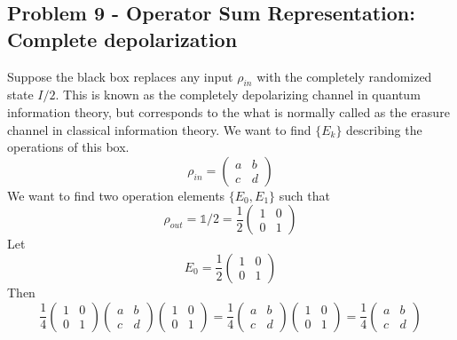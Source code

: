 \subsection{Problem 9 - Operator Sum Representation: Complete depolarization}
Suppose the black box replaces any input $\rho_{in}$ with the completely randomized state $I/2$. This is known as the completely depolarizing channel in quantum information theory, but corresponds to the what is normally called as the erasure channel in classical information theory. We want to find $\{E_k\}$ describing the operations of this box.
\begin{equation}
    \rho_{in} = \begin{pmatrix}a & b \\ c & d\end{pmatrix}
\end{equation}
We want to find two operation elements $\{E_0,E_1\}$ such that 
\begin{equation}
    \rho_{out} = \mathbb{1}/2 = \frac{1}{2}\begin{pmatrix}1 & 0 \\ 0 & 1\end{pmatrix}
\end{equation}
Let 
\begin{equation}
    E_0 = \frac{1}{2}\begin{pmatrix}1 & 0 \\ 0 & 1\end{pmatrix}
\end{equation}
Then 
\begin{equation}
    \frac{1}{4}\begin{pmatrix}1 & 0\\ 0 & 1\end{pmatrix}  \begin{pmatrix}a & b \\ c & d\end{pmatrix} \begin{pmatrix}1 & 0 \\ 0 & 1\end{pmatrix}  = \frac{1}{4} \begin{pmatrix}a & b  \\ c & d\end{pmatrix} \begin{pmatrix}1 & 0 \\ 0 & 1\end{pmatrix} = \frac{1}{4} \begin{pmatrix}a & b \\ c & d\end{pmatrix}
\end{equation}

